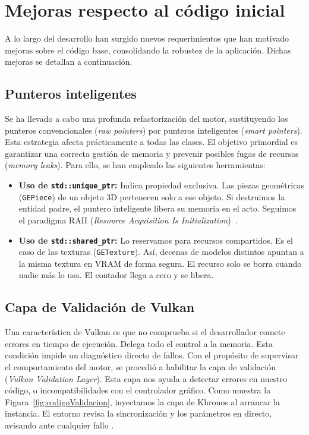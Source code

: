 \chapter{Mejoras respecto al código inicial}

A lo largo del desarrollo han surgido nuevos requerimientos que han motivado mejoras sobre el código base, consolidando la robustez de la aplicación. 
Dichas mejoras se detallan a continuación.

\section{Punteros inteligentes}
Se ha llevado a cabo una profunda refactorización del motor, sustituyendo los punteros convencionales (\textit{raw pointers}) por punteros inteligentes (\textit{smart pointers}). 
Esta estrategia afecta prácticamente a todas las clases. El objetivo primordial es garantizar una correcta gestión de memoria y prevenir posibles fugas de recursos (\textit{memory leaks}).
Para ello, se han empleado las siguientes herramientas:
\begin{itemize}
    \item \textbf{Uso de \texttt{std::unique\_ptr}:} Indica propiedad exclusiva. Las piezas geométricas (\texttt{GEPiece}) de un objeto 3D pertenecen solo a ese objeto. Si destruimos la entidad padre, el puntero inteligente libera su memoria en el acto. Seguimos el paradigma RAII (\textit{Resource Acquisition Is Initialization})~\parencite{stroustrup2013cpp}.
    \item \textbf{Uso de \texttt{std::shared\_ptr}:} Lo reservamos para recursos compartidos. Es el caso de las texturas (\texttt{GETexture}). Así, decenas de modelos distintos apuntan a la misma textura en VRAM de forma segura. El recurso solo se borra cuando nadie más lo usa. El contador llega a cero y se libera.
\end{itemize}

\section{Capa de Validación de Vulkan}
Una característica de Vulkan es que no comprueba si el desarrollador comete errores en tiempo de ejecución.
Delega todo el control a la memoria. Esta condición impide un diagnóstico directo de fallos. Con el propósito de supervisar el comportamiento del motor, se procedió a habilitar la capa de validación (\textit{Vulkan Validation Layer}). 
Esta capa nos ayuda a detectar errores en nuestro código, o incompatibilidades con el controlador gráfico. 
Como muestra la Figura~\ref{fig:codigoValidacion}, inyectamos la capa de Khronos al arrancar la instancia. 
El entorno revisa la sincronización y los parámetros en directo, avisando ante cualquier fallo \parencite{vulkan_validation}.

